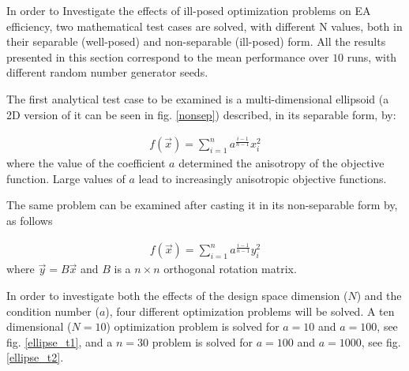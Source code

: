 In order to Investigate the effects of ill-posed optimization problems on EA efficiency, two mathematical test cases are solved, with different N values, both in their separable (well-posed) and non-separable (ill-posed) form. All the results presented in this section correspond to the mean performance over $10$ runs, with different random number generator seeds. 

The first analytical test case to be examined is a multi-dimensional ellipsoid (a 2D version of it can be seen in fig. \ref{nonsep}) described, in its separable form, by:   


\begin{eqnarray}
   f(\vec{x})=\sum^{n}_{i=1} a^{\frac{i-1}{n-1}}x_i^2
   \label{ellipse} 
\end{eqnarray}
where the value of the coefficient $a$ determined the anisotropy of the objective function. Large values of $a$ lead to increasingly anisotropic objective functions.

The same problem can be examined after casting it in its non-separable form by, as follows

\begin{eqnarray}
   f(\vec{x})=\sum^{n}_{i=1}a^{\frac{i-1}{n-1}}y_i^2
   \label{ellipse} 
\end{eqnarray}
where $\vec{y}=B\vec{x}$ and $B$ is a $n\times n$ orthogonal rotation matrix.

In order to investigate both the effects of the design space dimension ($N$) and the condition number ($a$), four different optimization problems will be solved. A ten dimensional ($N\!=\!10$) optimization problem is solved for $a\!=\!10$ and $a\!=\!100$, see fig. \ref{ellipse_t1}, and a $n\!=\!30$ problem is solved for $a\!=\!100$ and $a\!=\!1000$, see fig. \ref{ellipse_t2}. 


